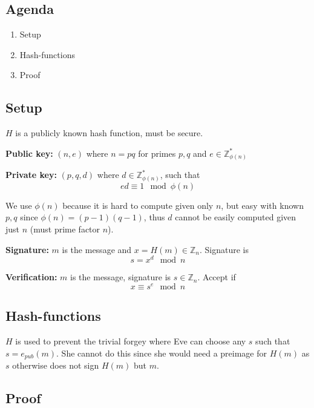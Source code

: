 

\subsection*{Agenda}
\begin{enumerate}
\item Setup
\item Hash-functions
\item Proof
\end{enumerate}

\subsection{Setup}
$H$ is a publicly known hash function, must be secure.

\textbf{Public key:} $(n, e)$ where $n = pq$ for primes $p, q$ and $e \in \mathbb{Z}_{\phi(n)}^*$

\textbf{Private key:} $(p, q, d)$ where $d \in \mathbb{Z}_{\phi(n)}^*$, such that
\[ ed \equiv 1 \mod \phi(n) \]

We use $\phi(n)$ because it is hard to compute given only $n$, but
easy with known $p, q$ since $\phi(n) = (p-1)(q-1)$, thus $d$ cannot
be easily computed given just $n$ (must prime factor $n$).

\textbf{Signature:} $m$ is the message and $x = H(m) \in \mathbb{Z}_n$. Signature is
\[ s = x^d \mod n \]

\textbf{Verification:} $m$ is the message, signature is $s \in \mathbb{Z}_n$. Accept if
\[ x \equiv s^e \mod n \]

\subsection{Hash-functions}
$H$ is used to prevent the trivial forgey where Eve can choose any $s$
such that $s = e_{pub}(m)$. She cannot do this since she would need a
preimage for $H(m)$ as $s$ otherwise does not sign $H(m)$ but $m$.

\subsection{Proof}

